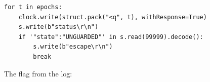 \begin{lstlisting}[basicstyle=\ttfamily\scriptsize]
for t in epochs:
    clock.write(struct.pack("<q", t), withResponse=True)
    s.write(b"status\r\n")
    if '"state":"UNGUARDED"' in s.read(99999).decode():
        s.write(b"escape\r\n")
        break
\end{lstlisting}

The flag from the log:

\begin{center}
\end{center}
